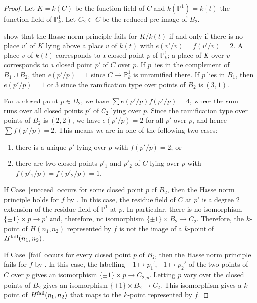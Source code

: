 \documentclass{amsart}
\numberwithin{equation}{section} \numberwithin{figure}{section}
\newcommand\PP{\mathbb{P}}
\theoremstyle{one}
\theoremstyle{definition}
\begin{document}
\begin{proof}
  Let \(K = k(C)\) be the function field of \(C\) and \(k(\PP^1) = k(t)\) the function field of \(\PP^1_k\).
  Let \(C_2 \subset C\) be the reduced pre-image of \(B_2\).
    
   show that the Hasse norm principle fails for $K/k(t)$ if and only if there is no place $v'$ of $K$ lying above a place $v$ of $k(t)$ with $e(v'/v)=f(v'/v)=2$.
  A place \(v\) of \(k(t)\) corresponds to a closed point \(p\) of \(\PP^1_k\); a place of \(K\) over \(v\) corresponds to a closed point \(p'\) of \(C\) over \(p\).
  If \(p\) lies in the complement of \(B_1 \cup B_2\), then \(e(p'/p) = 1\) since \(C \to \PP^1_k\) is unramified there.
  If \(p\) lies in \(B_1\), then \(e(p'/p) = 1\) or \(3\) since the ramification type over points of \(B_2\) is \((3,1)\).
 
  
  For a closed point \(p \in B_2\), we have $\sum e(p'/p)f(p'/p)=4$, where the sum runs over all closed points \(p'\) of \(C_2\) lying over $p$.
  Since the ramification type over points of \(B_2\) is $(2,2)$, we have $e(p'/p)=2$ for all \(p'\) over \(p\), and hence $\sum f(p'/p)=2$. This means we are in one of the following two cases: 
\begin{enumerate}
    \item \label{succeed} there is a unique $p'$ lying over \(p\) with $f(p'/p)=2$; or
    \item \label{fail} there are two closed points $p'_1$ and $p'_2$ of $C$ lying over \(p\) with $f(p'_1/p)=f(p'_2/p)=1$. 
\end{enumerate}

    
    
If Case~\ref{succeed} occurs for some closed point \(p\) of \(B_2\), then the Hasse norm principle holds for \(f\) by . 
In this case, the residue field of \(C\) at \(p'\) is a degree 2 extension of the residue field of \(\PP^1\) at \(p\).
In particular, there is no isomorphism \(\{\pm 1\} \times p \to p'\) and, therefore, no isomorphism \(\{\pm 1\} \times B_2 \to C_2\).
Therefore, the \(k\)-point of \(H(n_1,n_2)\) represented by \(f\) is not the image of a \(k\)-point of \(H^{\rm fail}(n_{1},n_2)\).

If Case~\ref{fail} occurs for every closed point \(p\) of \(B_2\), then the Hasse norm principle fails for \(f\) by .
In this case, the labelling \(+1 \mapsto p_1', -1 \mapsto p_2'\) of the two points of \(C\) over \(p\) gives an isomorphism \(\{\pm 1\} \times p \to C_{2,p}\). 
Letting \(p\) vary over the closed points of \(B_2\) gives an isomorphism \(\{\pm 1\} \times B_2 \to C_2\).
This isomorphism gives a \(k\)-point of \(H^{\rm fail}(n_1,n_2)\) that maps to the \(k\)-point represented by \(f\).
\end{proof}
\end{document}
